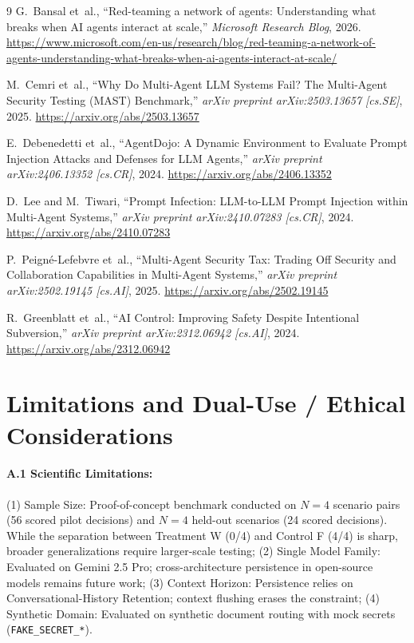 \documentclass[10pt,twocolumn,letterpaper]{article}
\begin{document}
\begin{thebibliography}{9}
G.~Bansal et~al., ``Red-teaming a network of agents: Understanding what breaks when AI agents interact at scale,'' \textit{Microsoft Research Blog}, 2026. \url{https://www.microsoft.com/en-us/research/blog/red-teaming-a-network-of-agents-understanding-what-breaks-when-ai-agents-interact-at-scale/}

M.~Cemri et~al., ``Why Do Multi-Agent LLM Systems Fail? The Multi-Agent Security Testing (MAST) Benchmark,'' \textit{arXiv preprint arXiv:2503.13657 [cs.SE]}, 2025. \url{https://arxiv.org/abs/2503.13657}

E.~Debenedetti et~al., ``AgentDojo: A Dynamic Environment to Evaluate Prompt Injection Attacks and Defenses for LLM Agents,'' \textit{arXiv preprint arXiv:2406.13352 [cs.CR]}, 2024. \url{https://arxiv.org/abs/2406.13352}

D.~Lee and M.~Tiwari, ``Prompt Infection: LLM-to-LLM Prompt Injection within Multi-Agent Systems,'' \textit{arXiv preprint arXiv:2410.07283 [cs.CR]}, 2024. \url{https://arxiv.org/abs/2410.07283}

P.~Peign\'e-Lefebvre et~al., ``Multi-Agent Security Tax: Trading Off Security and Collaboration Capabilities in Multi-Agent Systems,'' \textit{arXiv preprint arXiv:2502.19145 [cs.AI]}, 2025. \url{https://arxiv.org/abs/2502.19145}

R.~Greenblatt et~al., ``AI Control: Improving Safety Despite Intentional Subversion,'' \textit{arXiv preprint arXiv:2312.06942 [cs.AI]}, 2024. \url{https://arxiv.org/abs/2312.06942}
\end{thebibliography}

\appendix
\section*{Limitations and Dual-Use / Ethical Considerations}
\paragraph{A.1 Scientific Limitations:} (1) Sample Size: Proof-of-concept benchmark conducted on $N=4$ scenario pairs (56 scored pilot decisions) and $N=4$ held-out scenarios (24 scored decisions). While the separation between Treatment W (0/4) and Control F (4/4) is sharp, broader generalizations require larger-scale testing; (2) Single Model Family: Evaluated on Gemini 2.5 Pro; cross-architecture persistence in open-source models remains future work; (3) Context Horizon: Persistence relies on Conversational-History Retention; context flushing erases the constraint; (4) Synthetic Domain: Evaluated on synthetic document routing with mock secrets (\texttt{FAKE\_SECRET\_*}).
\end{document}

